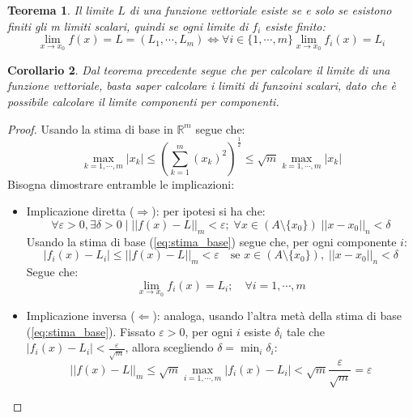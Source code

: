 \documentclass[11pt, a4paper, openright]{book}
\theoremstyle{plain}
\newtheorem{teorema}{Teorema}[section]
\newtheorem{corollario}[teorema]{Corollario}
\theoremstyle{definition}
\theoremstyle{remark}
\begin{document}
\begin{teorema}\label{teo:limiti_componenti}Il limite $L$ di una funzione vettoriale esiste se e solo se esistono finiti gli m limiti scalari, quindi se ogni limite di $f_i$ esiste finito:
    \begin{equation}
        \lim_{x \to x_0 } f(x) = L = (L_1, \cdots, L_m) \iff \forall i \in \{1, \cdots, m\} \lim_{x \to x_0} f_i(x) = L_i
    \end{equation}
\end{teorema}

\begin{corollario}Dal teorema precedente segue che per calcolare il limite di una funzione vettoriale, basta saper calcolare i limiti di funzoini scalari, dato che è possibile calcolare il limite componenti per componenti.
\end{corollario}
\begin{proof}
    Usando la stima di base in $\mathbb{R}^m$ segue che:
    \begin{equation}\label{eq:stima_base}
        \max_{k = 1, \cdots, m} |x_k| \leq \left(\sum_{k = 1}^{m} (x_k)^2 \right)^\frac{1}{2} \leq \sqrt{m} \max_{k = 1, \cdots, m} |x_k|
    \end{equation}
    Bisogna dimostrare entramble le implicazioni:
    \begin{itemize}
        \item Implicazione diretta ($\Longrightarrow$): per ipotesi si ha che:
        \begin{equation}
            \forall \varepsilon > 0, \exists \delta > 0 \mid ||f(x) - L||_m < \varepsilon; \; \forall x \in (A \setminus \{x_0\}) \; ||x - x_0||_n < \delta
        \end{equation}
        Usando la stima di base (\ref{eq:stima_base}) segue che, per ogni componente $i$:
        \begin{equation}
            |f_i(x) - L_i| \leq ||f(x) - L||_m < \varepsilon \quad \text{se } x \in (A \setminus \{x_0\}), \; ||x - x_0||_n < \delta
        \end{equation}
        Segue che:
        \begin{equation}
            \lim_{x \to x_0} f_i(x) = L_i; \quad \forall i = 1, \cdots, m
        \end{equation}
        \item Implicazione inversa ($\Longleftarrow$): analoga, usando l'altra metà della stima di base (\ref{eq:stima_base}). Fissato $\varepsilon > 0$, per ogni $i$ esiste $\delta_i$ tale che $|f_i(x) - L_i| < \frac{\varepsilon}{\sqrt{m}}$, allora scegliendo $\delta = \min_i \delta_i$:
        \begin{equation}
            ||f(x) - L||_m \leq \sqrt{m} \max_{i = 1, \cdots, m} |f_i(x) - L_i| < \sqrt{m} \frac{\varepsilon}{\sqrt{m}} = \varepsilon
        \end{equation}
    \end{itemize}
\end{proof}
\end{document}
